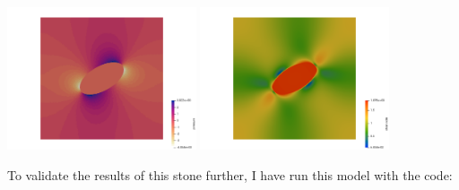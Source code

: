\begin{center}
\includegraphics[width=5.57cm]{python_codes/fieldstone_142/results/case2/press}
\includegraphics[width=5.57cm]{python_codes/fieldstone_142/results/case2/sr}
\end{center}

To validate the results of this stone further, I have run this model with the \aspect
code:


